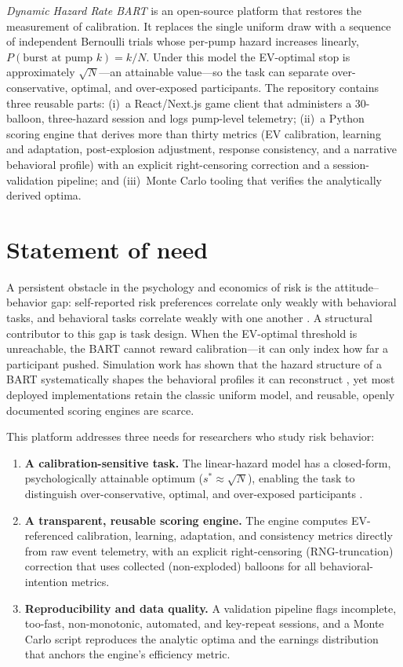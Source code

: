 \documentclass[11pt]{article}
\begin{document}
\emph{Dynamic Hazard Rate BART} is an open-source platform that restores the
measurement of calibration. It replaces the single uniform draw with a sequence
of independent Bernoulli trials whose per-pump hazard increases linearly,
$P(\text{burst at pump }k)=k/N$. Under this model the EV-optimal stop is
approximately $\sqrt{N}$---an attainable value---so the task can separate
over-conservative, optimal, and over-exposed participants. The repository contains
three reusable parts: (i)~a React/Next.js game client that administers a
30-balloon, three-hazard session and logs pump-level telemetry; (ii)~a Python
scoring engine that derives more than thirty metrics (EV calibration, learning and
adaptation, post-explosion adjustment, response consistency, and a narrative
behavioral profile) with an explicit right-censoring correction and a
session-validation pipeline; and (iii)~Monte Carlo tooling that verifies the
analytically derived optima.

\section{Statement of need}

A persistent obstacle in the psychology and economics of risk is the
attitude--behavior gap: self-reported risk preferences correlate only weakly with
behavioral tasks, and behavioral tasks correlate weakly with one another
\citep{frey2017,pedroni2017}. A structural contributor to this gap is task design.
When the EV-optimal threshold is unreachable, the BART cannot reward
calibration---it can only index how far a participant pushed. Simulation work has
shown that the hazard structure of a BART systematically shapes the behavioral
profiles it can reconstruct \citep{diplinio2022}, yet most deployed
implementations retain the classic uniform model, and reusable, openly documented
scoring engines are scarce.

This platform addresses three needs for researchers who study risk behavior:

\begin{enumerate}[leftmargin=1.4em]
  \item \textbf{A calibration-sensitive task.} The linear-hazard model has a
  closed-form, psychologically attainable optimum ($s^*\approx\sqrt{N}$), enabling
  the task to distinguish over-conservative, optimal, and over-exposed
  participants \citep{pleskac2008,wallsten2005}.
  \item \textbf{A transparent, reusable scoring engine.} The engine computes
  EV-referenced calibration, learning, adaptation, and consistency metrics
  directly from raw event telemetry, with an explicit right-censoring
  (RNG-truncation) correction that uses collected (non-exploded) balloons for all
  behavioral-intention metrics.
  \item \textbf{Reproducibility and data quality.} A validation pipeline flags
  incomplete, too-fast, non-monotonic, automated, and key-repeat sessions, and a
  Monte Carlo script reproduces the analytic optima and the earnings distribution
  that anchors the engine's efficiency metric.
\end{enumerate}
\end{document}
